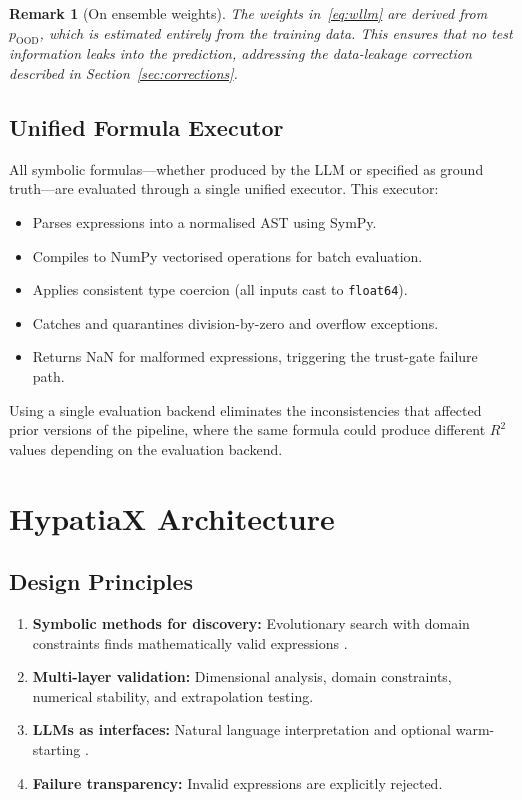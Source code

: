 \documentclass[twoside,11pt]{article}
\newcommand{\Rsq}{R^{2}}
\newtheorem{remark}[theorem]{Remark}
\begin{document}
\begin{remark}[On ensemble weights]
The weights in~\eqref{eq:wllm} are derived from $p_{\mathrm{OOD}}$, which is
estimated entirely from the training data.  This ensures that no test information
leaks into the prediction, addressing the data-leakage correction described in
Section~\ref{sec:corrections}.
\end{remark}

\subsection{Unified Formula Executor}
\label{sec:executor}

All symbolic formulas---whether produced by the LLM or specified as ground truth---are
evaluated through a single unified executor.  This executor:
\begin{itemize}
  \item Parses expressions into a normalised AST using SymPy.
  \item Compiles to NumPy vectorised operations for batch evaluation.
  \item Applies consistent type coercion (all inputs cast to \texttt{float64}).
  \item Catches and quarantines division-by-zero and overflow exceptions.
  \item Returns NaN for malformed expressions, triggering the trust-gate failure path.
\end{itemize}
Using a single evaluation backend eliminates the inconsistencies that affected
prior versions of the pipeline, where the same formula could produce different
$\Rsq$ values depending on the evaluation backend.

\section{HypatiaX Architecture}
\label{sec:architecture}

\subsection{Design Principles}

\begin{enumerate}
\item \textbf{Symbolic methods for discovery:} Evolutionary search with domain
  constraints finds mathematically valid expressions \citep{cranmer2023pysr}.
\item \textbf{Multi-layer validation:} Dimensional analysis, domain constraints,
  numerical stability, and extrapolation testing.
\item \textbf{LLMs as interfaces:} Natural language interpretation and optional
  warm-starting \citep{kambhampati2024llms}.
\item \textbf{Failure transparency:} Invalid expressions are explicitly rejected.
\end{enumerate}
\end{document}
